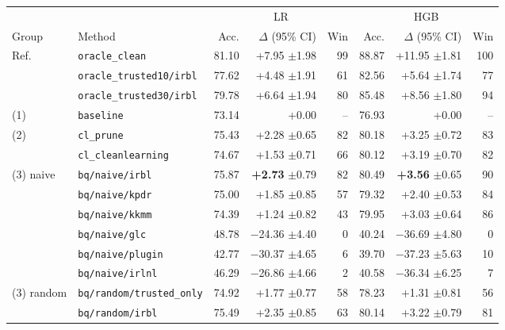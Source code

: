\begin{tabular}{llrrrrrr}
\toprule
 &  & \multicolumn{3}{c}{LR} & \multicolumn{3}{c}{HGB} \\
\cmidrule(lr){3-5} \cmidrule(lr){6-8}
Group & Method & Acc. & $\Delta$ (95\% CI) & Win & Acc. & $\Delta$ (95\% CI) & Win \\
\midrule
Ref. & \texttt{oracle\_clean} & 81.10 & +7.95 {\scriptsize$\pm$1.98} & 99 & 88.87 & +11.95 {\scriptsize$\pm$1.81} & 100 \\
 & \texttt{oracle\_trusted10/irbl} & 77.62 & +4.48 {\scriptsize$\pm$1.91} & 61 & 82.56 & +5.64 {\scriptsize$\pm$1.74} & 77 \\
 & \texttt{oracle\_trusted30/irbl} & 79.78 & +6.64 {\scriptsize$\pm$1.94} & 80 & 85.48 & +8.56 {\scriptsize$\pm$1.80} & 94 \\
\addlinespace
(1) & \texttt{baseline} & 73.14 & +0.00 & -- & 76.93 & +0.00 & -- \\
\addlinespace
(2) & \texttt{cl\_prune} & 75.43 & +2.28 {\scriptsize$\pm$0.65} & 82 & 80.18 & +3.25 {\scriptsize$\pm$0.72} & 83 \\
 & \texttt{cl\_cleanlearning} & 74.67 & +1.53 {\scriptsize$\pm$0.71} & 66 & 80.12 & +3.19 {\scriptsize$\pm$0.70} & 82 \\
\addlinespace
(3) naive & \texttt{bq/naive/irbl} & 75.87 & \textbf{+2.73} {\scriptsize$\pm$0.79} & 82 & 80.49 & \textbf{+3.56} {\scriptsize$\pm$0.65} & 90 \\
 & \texttt{bq/naive/kpdr} & 75.00 & +1.85 {\scriptsize$\pm$0.85} & 57 & 79.32 & +2.40 {\scriptsize$\pm$0.53} & 84 \\
 & \texttt{bq/naive/kkmm} & 74.39 & +1.24 {\scriptsize$\pm$0.82} & 43 & 79.95 & +3.03 {\scriptsize$\pm$0.64} & 86 \\
 & \texttt{bq/naive/glc} & 48.78 & $-$24.36 {\scriptsize$\pm$4.40} & 0 & 40.24 & $-$36.69 {\scriptsize$\pm$4.80} & 0 \\
 & \texttt{bq/naive/plugin} & 42.77 & $-$30.37 {\scriptsize$\pm$4.65} & 6 & 39.70 & $-$37.23 {\scriptsize$\pm$5.63} & 10 \\
 & \texttt{bq/naive/irlnl} & 46.29 & $-$26.86 {\scriptsize$\pm$4.66} & 2 & 40.58 & $-$36.34 {\scriptsize$\pm$6.25} & 7 \\
\addlinespace
(3) random & \texttt{bq/random/trusted\_only} & 74.92 & +1.77 {\scriptsize$\pm$0.77} & 58 & 78.23 & +1.31 {\scriptsize$\pm$0.81} & 56 \\
 & \texttt{bq/random/irbl} & 75.49 & +2.35 {\scriptsize$\pm$0.85} & 63 & 80.14 & +3.22 {\scriptsize$\pm$0.79} & 81 \\

\end{tabular}
